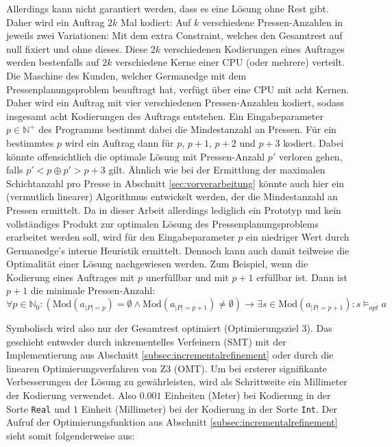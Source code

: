 Allerdings kann nicht garantiert werden, dass es eine Lösung ohne Rest gibt.
Daher wird ein Auftrag $2k$ Mal kodiert: Auf $k$ verschiedene Pressen-Anzahlen in jeweils zwei Variationen:
Mit dem extra Constraint, welches den Gesamtrest auf null fixiert und ohne dieses.
Diese $2k$ verschiedenen Kodierungen eines Auftrages werden bestenfalls auf $2k$ verschiedene Kerne einer CPU (oder mehrere) verteilt.
Die Maschine des Kunden, welcher Germanedge mit dem Pressenplanungsproblem beauftragt hat, verfügt über eine CPU mit acht Kernen.
Daher wird ein Auftrag mit vier verschiedenen Pressen-Anzahlen kodiert, sodass insgesamt acht Kodierungen des Auftrags entstehen.
Ein Eingabeparameter $p \in \mathbb{N}^+$ des Programms bestimmt dabei die Mindestanzahl an Pressen.
Für ein bestimmtes $p$ wird ein Auftrag dann für $p$, $p+1$, $p+2$ und $p+3$ kodiert.
Dabei könnte offensichtlich die optimale Lösung mit Pressen-Anzahl $p\prime$ verloren gehen, falls $p\prime < p \oplus p\prime > p + 3$ gilt.
Ähnlich wie bei der Ermittlung der maximalen Schichtanzahl pro Presse in Abschnitt \ref{sec:vorverarbeitung} könnte auch hier ein
(vermutlich linearer) Algorithmus entwickelt werden, der die Mindestanzahl an Pressen ermittelt.
Da in dieser Arbeit allerdings lediglich ein Prototyp und kein vollständiges Produkt zur optimalen Lösung des Pressenplanungsproblems erarbeitet werden soll,
wird für den Eingabeparameter $p$ ein niedriger Wert durch Germanedge's interne Heuristik ermittelt.
Dennoch kann auch damit teilweise die Optimalität einer Lösung nachgewiesen werden.
Zum Beispiel, wenn die Kodierung eines Auftrages mit $p$ unerfüllbar und mit $p+1$ erfüllbar ist.
Dann ist $p+1$ die minimale Pressen-Anzahl:
\[
    \forall p \in \mathbb{N}_0: \left(\text{Mod}(a_{\lvert P \rvert = p}) = \emptyset \land \text{Mod}(a_{\lvert P \rvert = p+1}) \neq \emptyset\right) \rightarrow
    \exists s \in \text{Mod}(a_{\lvert P \rvert = p+1}): s \models_{opt} a
\]

Symbolisch wird also nur der Gesamtrest optimiert (Optimierungsziel 3).
Das geschieht entweder durch inkrementelles Verfeinern (SMT) mit der Implementierung aus Abschnitt \ref{subsec:incrementalrefinement} oder durch
die linearen Optimierungsverfahren von Z3 (OMT).
Um bei ersterer signifikante Verbesserungen der Lösung zu gewährleisten, wird als Schrittweite ein Millimeter der Kodierung verwendet.
Also $0.001$ Einheiten (Meter) bei Kodierung in der Sorte \texttt{Real} und $1$ Einheit (Millimeter) bei der Kodierung in der Sorte \texttt{Int}.
Der Aufruf der Optimierungsfunktion aus Abschnitt \ref{subsec:incrementalrefinement} sieht somit folgenderweise aus:

